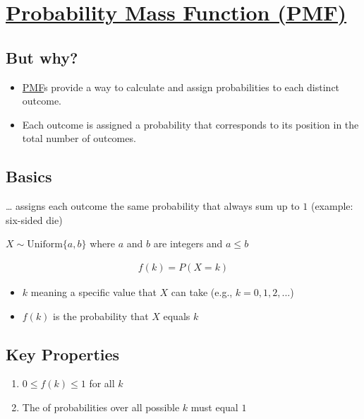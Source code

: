 \documentclass[
  a4paper,
]{scrbook}
\providecommand{\tightlist}{%
  \setlength{\itemsep}{0pt}\setlength{\parskip}{0pt}}\usepackage{longtable,booktabs,array}
\begin{document}
\section{\texorpdfstring{\hyperref[acronyms_PMF]{Probability Mass
Function (PMF)}}{Probability Mass Function (PMF)}}\label{section-2}

\subsection{But why?}\label{but-why}

\begin{itemize}
\tightlist
\item
  \hyperref[acronyms_PMF]{PMF}s provide a way to calculate and assign
  probabilities to each distinct outcome.
\item
  Each outcome is assigned a probability that corresponds to its
  position in the total number of outcomes.
\end{itemize}

\subsection{Basics}\label{basics}

\ldots{} assigns each outcome the same probability that always sum up to
\(1\) (example: six-sided die)

\(X \sim \mathrm{Uniform}\{a,b\}\) where \(a\) and \(b\) are integers
and \(a\leq b\)

\begin{align}
f(k) = P (X = k)
\end{align}

\begin{itemize}
\tightlist
\item
  \(k\) meaning a specific value that \(X\) can take (e.g.,
  \(k = 0,1,2, ...\))
\item
  \(f(k)\) is the probability that \(X\) equals \(k\)
\end{itemize}

\subsection{Key Properties}\label{key-properties}

\begin{enumerate}
\def\labelenumi{\arabic{enumi}.}
\tightlist
\item
  \(0 \leq f(k) \leq 1\) for all \(k\)
\item
  The of probabilities over all possible \(k\) must equal \(1\)
\end{enumerate}
\end{document}
